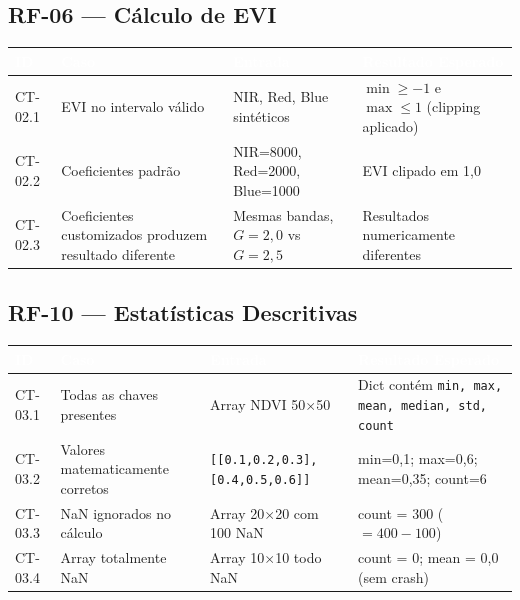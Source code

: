 \documentclass[11pt, a4paper]{article}
\begin{document}
\subsection{RF-06 --- Cálculo de EVI}

\begin{table}[H]
\centering
\footnotesize
{}
\begin{tabularx}{\textwidth}{@{}p{1.5cm}p{4cm}p{3.5cm}X@{}}
\toprule
\rowcolor{tabheader}\textcolor{white}{\textbf{ID}} & \textcolor{white}{\textbf{Caso}} & \textcolor{white}{\textbf{Entrada}} & \textcolor{white}{\textbf{Resultado Esperado}}\\
\midrule
CT-02.1 & EVI no intervalo válido & NIR, Red, Blue sintéticos & $\min \geq -1$ e $\max \leq 1$ (clipping aplicado)\\
CT-02.2 & Coeficientes padrão & NIR=8000, Red=2000, Blue=1000 & EVI clipado em 1{,}0\\
CT-02.3 & Coeficientes customizados produzem resultado diferente & Mesmas bandas, $G=2{,}0$ vs $G=2{,}5$ & Resultados numericamente diferentes\\
\bottomrule
\end{tabularx}
\end{table}

\subsection{RF-10 --- Estatísticas Descritivas}

\begin{table}[H]
\centering
\footnotesize
{}
\begin{tabularx}{\textwidth}{@{}p{1.5cm}p{4cm}p{3.5cm}X@{}}
\toprule
\rowcolor{tabheader}\textcolor{white}{\textbf{ID}} & \textcolor{white}{\textbf{Caso}} & \textcolor{white}{\textbf{Entrada}} & \textcolor{white}{\textbf{Resultado Esperado}}\\
\midrule
CT-03.1 & Todas as chaves presentes & Array NDVI 50$\times$50 & Dict contém \texttt{min, max, mean, median, std, count}\\
CT-03.2 & Valores matematicamente corretos & \texttt{[[0.1,0.2,0.3],[0.4,0.5,0.6]]} & min=0{,}1; max=0{,}6; mean=0{,}35; count=6\\
CT-03.3 & NaN ignorados no cálculo & Array 20$\times$20 com 100 NaN & count = 300 ($= 400 - 100$)\\
CT-03.4 & Array totalmente NaN & Array 10$\times$10 todo NaN & count = 0; mean = 0{,}0 (sem crash)\\
\bottomrule
\end{tabularx}
\end{table}
\end{document}
